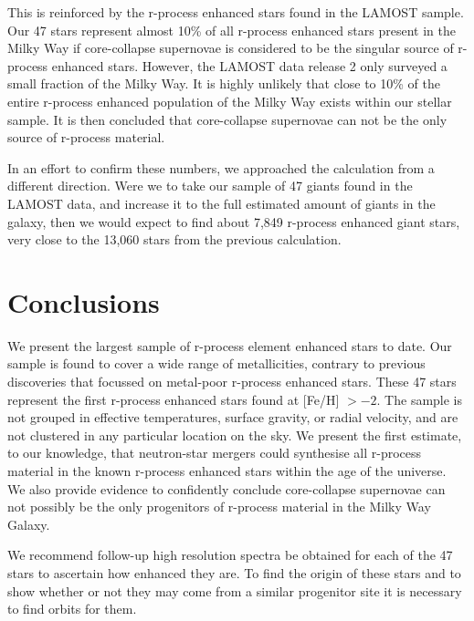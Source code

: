 \documentclass[a4paper,fleqn,usenatbib]{mnras}
\begin{document}
    This is reinforced by the r-process enhanced stars found in the LAMOST sample. Our 47 stars represent almost 10\% of all r-process enhanced stars present in the Milky Way if core-collapse supernovae is considered to be the singular source of r-process enhanced stars. However, the LAMOST data release 2 only surveyed a small fraction of the Milky Way. It is highly unlikely that close to 10\% of the entire r-process enhanced population of the Milky Way exists within our stellar sample. It is then concluded that core-collapse supernovae can not be the only source of r-process material. 
    
    In an effort to confirm these numbers, we approached the calculation from a different direction. Were we to take our sample of 47 giants found in the LAMOST data, and increase it to the full estimated amount of giants in the galaxy, then we would expect to find about 7,849 r-process enhanced giant stars, very close to the 13,060 stars from the previous calculation.
	
	\section{Conclusions}
	We present the largest sample of r-process element enhanced stars to date. Our sample is found to cover a wide range of metallicities, contrary to previous discoveries that focussed on metal-poor r-process enhanced stars. These 47 stars represent the first r-process enhanced stars found at [Fe/H] $>-2$. The sample is not grouped in effective temperatures, surface gravity, or radial velocity, and are not clustered in any  particular location on the sky. We present the first estimate, to our knowledge, that neutron-star mergers could synthesise all r-process material in the known r-process enhanced stars within the age of the universe. We also provide evidence to confidently conclude core-collapse supernovae can not possibly be the only progenitors of r-process material in the Milky Way Galaxy.
	
	We recommend follow-up high resolution spectra be obtained for each of the 47 stars to ascertain how enhanced they are. To find the origin of these stars and to show whether or not they may come from a similar progenitor site it is necessary to find orbits for them.
	
	
	
\end{document}
